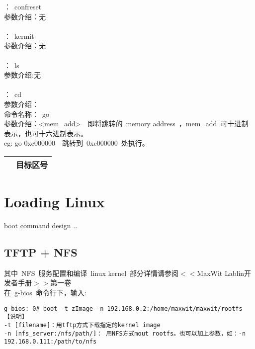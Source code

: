：~confreset~\\
参数介绍：无\\
\\
：~kermit~\\
参数介绍：无\\
\\
：~ls~\\
参数介绍:无\\
\\
：~cd~\\
参数介绍：\\

\noindent 命令名称：~go~ \\
参数介绍：<mem\_add>　即将跳转的~memory address~，mem\_add~可十进制表示，也可十六进制表示。
\\eg: go 0xc000000　跳转到~0xc000000~处执行。
\begin{table}[htbp]
\setlength{\parindent}{0pt}
\begin{tabular}{|c|c|}
\hline
[~N~] & 目标区号\\
\hline
\end{tabular}
\end{table}

\chapter{Loading Linux}

%
%

boot command design ..

\section{TFTP + NFS}

\indent 其中~NFS~服务配置和编译~linux kernel~部分详情请参阅$<<$MaxWit Lablin开发者手册$>>$第一卷\\
\indent 在~g-bios~命令行下，输入:\\

\begin{verbatim}
g-bios: 0# boot -t zImage -n 192.168.0.2:/home/maxwit/maxwit/rootfs
【说明】
-t [filename]：用tftp方式下载指定的kernel image
-n [nfs_server:/nfs/path/]： 用NFS方式mout rootfs。也可以加上参数，如：-n 192.168.0.111:/path/to/nfs
\end{verbatim}

